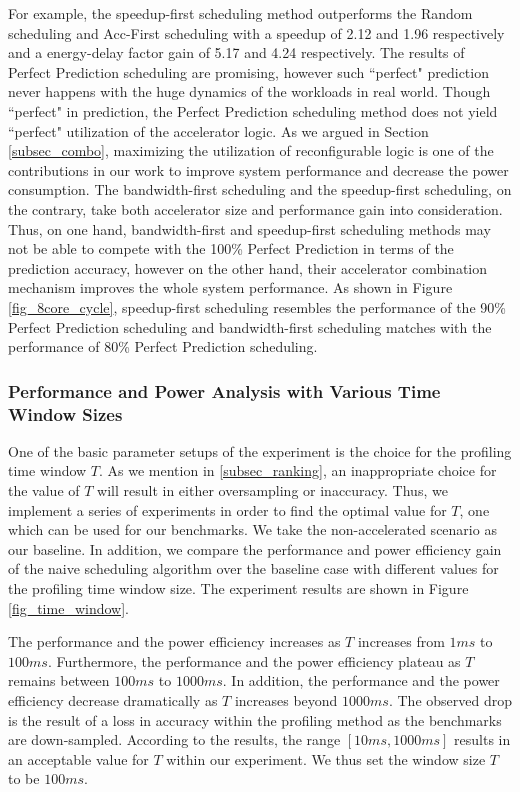 For example, the speedup-first scheduling method outperforms the
Random scheduling and Acc-First scheduling with a speedup of 2.12 and
1.96 respectively and a energy-delay factor gain of 5.17 and 4.24
respectively. The results of Perfect Prediction scheduling are
promising, however such ``perfect" prediction never happens with the
huge dynamics of the workloads in real world. Though ``perfect" in
prediction, the Perfect Prediction scheduling method does not yield
``perfect" utilization of the accelerator logic. 
As we argued in Section \ref{subsec_combo}, maximizing the utilization of reconfigurable logic is one of the contributions in our work to improve system performance and decrease the power consumption. The bandwidth-first scheduling and the speedup-first scheduling, on the contrary, take both accelerator size and performance gain into consideration. Thus, on one hand, bandwidth-first and speedup-first scheduling methods may not be able to compete with the 100\% Perfect Prediction in terms of the prediction accuracy, however on the other hand, their accelerator combination mechanism improves the whole system performance. As shown in Figure \ref{fig_8core_cycle}, speedup-first scheduling resembles the performance of the 90\% Perfect Prediction scheduling and bandwidth-first scheduling matches with the performance of 80\% Perfect Prediction scheduling. 
\fi

\subsubsection{Performance and Power Analysis with Various Time Window Sizes}

One of the basic parameter setups of the experiment is the choice for the profiling time window $T$. As we mention in \ref{subsec_ranking}, 
an inappropriate choice for the value of $T$ will result in either oversampling or inaccuracy. 
Thus, we implement a series of experiments in order to find the optimal value for $T$, one which can be used for our benchmarks. 
We take the non-accelerated scenario as our baseline. In addition, we compare the performance and power efficiency gain of the
 naive scheduling algorithm over the baseline case with different values for the profiling time window size. 
The experiment results are shown in Figure \ref{fig_time_window}.

The performance and the power efficiency increases as $T$ increases
from $1 ms$ to $100 ms$. Furthermore, the performance and the power efficiency plateau as $T$ remains between
 $100 ms$ to $1000 ms$.  In addition, the performance and the power efficiency decrease dramatically as $T$ increases beyond
$1000 ms$. The observed drop is the result of a loss in accuracy within the profiling
method as the benchmarks are down-sampled. According to the results, the range 
$[10 ms, 1000 ms]$ results in an acceptable value for $T$ within our
experiment. We thus set the window size $T$ to be $100 ms$.


